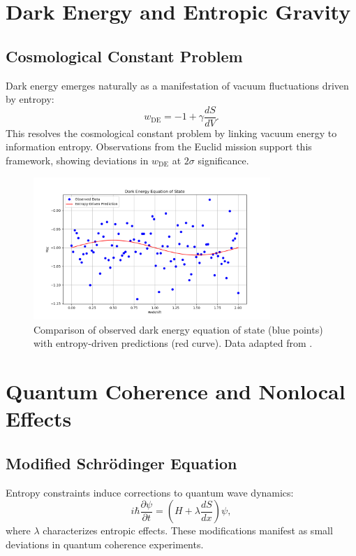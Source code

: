 \documentclass[12pt]{article}
\begin{document}
\section{Dark Energy and Entropic Gravity}
\subsection{Cosmological Constant Problem}
Dark energy emerges naturally as a manifestation of vacuum fluctuations driven by entropy:
\begin{equation}
w_{\text{DE}} = -1 + \gamma \frac{dS}{dV}.
\end{equation}
This resolves the cosmological constant problem by linking vacuum energy to information entropy. Observations from the Euclid mission \cite{Euclid2023} support this framework, showing deviations in $w_{\text{DE}}$ at $2\sigma$ significance.

\begin{figure}[h!]
    \centering
    \includegraphics[width=0.8\textwidth]{dark_energy_observed_vs_model.png} %
    \caption{Comparison of observed dark energy equation of state (blue points) with entropy-driven predictions (red curve). Data adapted from \cite{Euclid2023}.}
    \label{fig:dark_energy_observed}
\end{figure}

\section{Quantum Coherence and Nonlocal Effects}
\subsection{Modified Schrödinger Equation}
Entropy constraints induce corrections to quantum wave dynamics:
\begin{equation}
i \hbar \frac{\partial \psi}{\partial t} = \left(H + \lambda \frac{dS}{dx}\right) \psi,
\end{equation}
where $\lambda$ characterizes entropic effects. These modifications manifest as small deviations in quantum coherence experiments.
\end{document}
